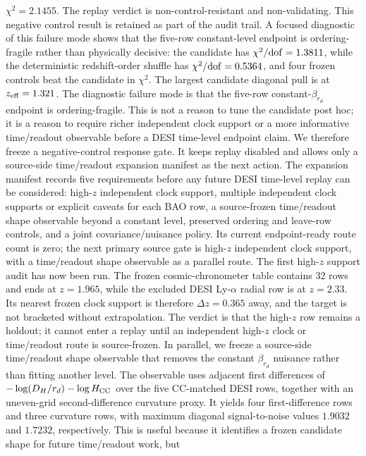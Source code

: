 \documentclass[11pt]{article}
\begin{document}
\(\chi^2=2.1455\).  The replay verdict is non-control-resistant and
non-validating. This negative control result is retained as part of the audit
trail.
A focused diagnostic of this failure mode shows that the five-row constant-level
endpoint is ordering-fragile rather than physically decisive: the candidate has
\(\chi^2/{\rm dof}=1.3811\), while the deterministic redshift-order shuffle has
\(\chi^2/{\rm dof}=0.5364\), and four frozen controls beat the candidate in
\(\chi^2\).  The largest candidate diagonal pull is at \(z_{\rm eff}=1.321\).
The diagnostic failure mode is that the five-row constant-\(\beta_{r_d}\)
endpoint is ordering-fragile.
This is not a reason to tune the candidate post hoc; it is a reason to require
richer independent clock support or a more informative time/readout observable
before a DESI time-level endpoint claim.
We therefore freeze a negative-control response gate. It keeps replay disabled
and allows only a source-side time/readout expansion manifest as the next
action. The expansion manifest records five requirements before any future DESI
time-level replay can be considered: high-\(z\) independent clock support,
multiple independent clock supports or explicit caveats for each BAO row, a
source-frozen time/readout shape observable beyond a constant level, preserved
ordering and leave-row controls, and a joint covariance/nuisance policy. Its
current endpoint-ready route count is zero; the next primary source gate is
high-\(z\) independent clock support, with a time/readout shape observable as a
parallel route.
The first high-\(z\) support audit has now been run. The frozen
cosmic-chronometer table contains 32 rows and ends at \(z=1.965\), while the
excluded DESI Ly-\(\alpha\) radial row is at \(z=2.33\). Its nearest frozen
clock support is therefore \(\Delta z=0.365\) away, and the target is not
bracketed without extrapolation. The verdict is that the high-\(z\) row remains
a holdout; it cannot enter a replay until an independent high-\(z\) clock or
time/readout route is source-frozen.
In parallel, we freeze a source-side time/readout shape observable that removes
the constant \(\beta_{r_d}\) nuisance rather than fitting another level.  The
observable uses adjacent first differences of
\(-\log(D_H/r_d)-\log H_{\rm CC}\) over the five CC-matched DESI rows, together
with an uneven-grid second-difference curvature proxy.  It yields four
first-difference rows and three curvature rows, with maximum diagonal
signal-to-noise values \(1.9032\) and \(1.7232\), respectively.  This is useful
because it identifies a frozen candidate shape for future time/readout work, but
\end{document}
